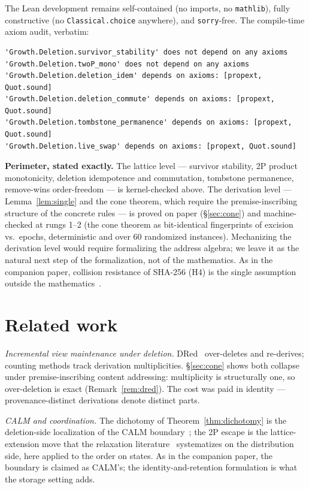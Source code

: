 \documentclass[11pt]{article}
\theoremstyle{definition}
\theoremstyle{remark}
\begin{document}
The Lean development remains self-contained (no imports, no \texttt{mathlib}), fully constructive (no \texttt{Classical.choice} anywhere), and \texttt{sorry}-free. The compile-time axiom audit, verbatim:

{\small
\begin{verbatim}
'Growth.Deletion.survivor_stability' does not depend on any axioms
'Growth.Deletion.twoP_mono' does not depend on any axioms
'Growth.Deletion.deletion_idem' depends on axioms: [propext, Quot.sound]
'Growth.Deletion.deletion_commute' depends on axioms: [propext, Quot.sound]
'Growth.Deletion.tombstone_permanence' depends on axioms: [propext, Quot.sound]
'Growth.Deletion.live_swap' depends on axioms: [propext, Quot.sound]
\end{verbatim}}

\noindent\textbf{Perimeter, stated exactly.} The lattice level --- survivor stability, 2P product monotonicity, deletion idempotence and commutation, tombstone permanence, remove-wins order-freedom --- is kernel-checked above. The derivation level --- Lemma~\ref{lem:single} and the cone theorem, which require the premise-inscribing structure of the concrete rules --- is proved on paper (\S\ref{sec:cone}) and machine-checked at rungs 1--2 (the cone theorem as bit-identical fingerprints of excision vs.\ epochs, deterministic and over 60 randomized instances). Mechanizing the derivation level would require formalizing the address algebra; we leave it as the natural next step of the formalization, not of the mathematics. As in the companion paper, collision resistance of SHA-256 (H4) is the single assumption outside the mathematics~\cite{RogawayShrimpton04}.

\section{Related work}\label{sec:related}

\emph{Incremental view maintenance under deletion.} DRed~\cite{GuptaMS93} over-deletes and re-derives; counting methods track derivation multiplicities. \S\ref{sec:cone} shows both collapse under premise-inscribing content addressing: multiplicity is structurally one, so over-deletion is exact (Remark~\ref{rem:dred}). The cost was paid in identity --- provenance-distinct derivations denote distinct parts.

\emph{CALM and coordination.} The dichotomy of Theorem~\ref{thm:dichotomy} is the deletion-side localization of the CALM boundary~\cite{Hellerstein10,AmelootNV13}; the 2P escape is the lattice-extension move that the relaxation literature~\cite{ZinnGL12,AmelootKNZ15} systematizes on the distribution side, here applied to the order on states. As in the companion paper, the boundary is claimed as CALM's; the identity-and-retention formulation is what the storage setting adds.
\end{document}
